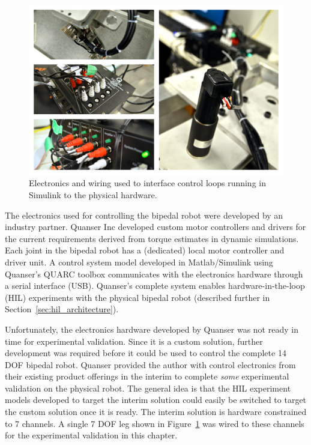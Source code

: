 \begin{figure}[!b]
	\centering
    \includegraphics[scale=0.39]{fig/hardware/bipedwired.png} 
  	\caption{Electronics and wiring used to interface control loops running in Simulink to the physical hardware.}
	\label{fig:bipedwired}
\end{figure}

The electronics used for controlling the bipedal robot were developed by an industry partner. Quanser Inc developed custom motor controllers and drivers for the current requirements derived from torque estimates in dynamic simulations. Each joint in the bipedal robot has a (dedicated) local motor controller and driver unit. A control system model developed in Matlab/Simulink using Quanser's QUARC toolbox communicates with the electronics hardware through a serial interface (USB). Quanser's complete system enables hardware-in-the-loop (HIL) experiments with the physical bipedal robot (described further in Section~\ref{sec:hil_architecture}).    

Unfortunately, the electronics hardware developed by Quanser was not ready in time for experimental validation. Since it is a custom solution, further development was required before it could be used to control the complete 14 DOF bipedal robot. Quanser provided the author with control electronics from their existing product offerings in the interim to complete \emph{some} experimental validation on the physical robot. The general idea is that the HIL experiment models developed to target the interim solution could easily be switched to target the custom solution once it is ready. The interim solution is hardware constrained to 7 channels. A single 7 DOF leg shown in Figure~\ref{fig:bipedwired} was wired to these channels for the experimental validation in this chapter. 

